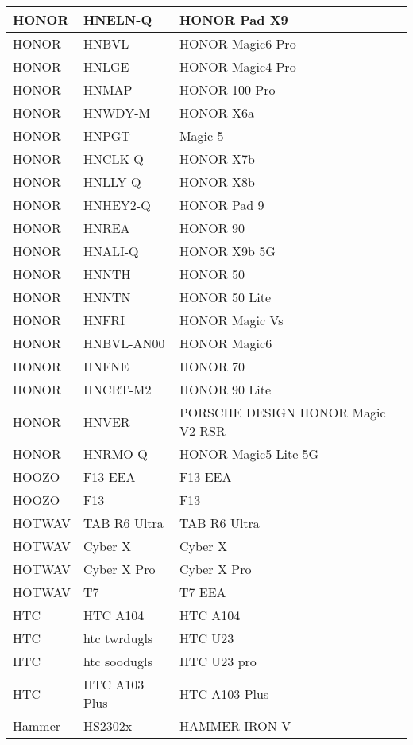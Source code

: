 \begin{tabularx}{\linewidth}{|l|X|X|}
        HONOR & HNELN-Q & HONOR Pad X9 \\ \hline
        HONOR & HNBVL & HONOR Magic6 Pro \\ \hline
        HONOR & HNLGE & HONOR Magic4 Pro \\ \hline
        HONOR & HNMAP & HONOR 100 Pro \\ \hline
        HONOR & HNWDY-M & HONOR X6a \\ \hline
        HONOR & HNPGT & Magic 5 \\ \hline
        HONOR & HNCLK-Q & HONOR X7b \\ \hline
        HONOR & HNLLY-Q & HONOR X8b \\ \hline
        HONOR & HNHEY2-Q & HONOR Pad 9 \\ \hline
        HONOR & HNREA & HONOR 90 \\ \hline
        HONOR & HNALI-Q & HONOR X9b 5G \\ \hline
        HONOR & HNNTH & HONOR 50 \\ \hline
        HONOR & HNNTN & HONOR 50 Lite \\ \hline
        HONOR & HNFRI & HONOR Magic Vs \\ \hline
        HONOR & HNBVL-AN00 & HONOR Magic6 \\ \hline
        HONOR & HNFNE & HONOR 70 \\ \hline
        HONOR & HNCRT-M2 & HONOR 90 Lite \\ \hline
        HONOR & HNVER & PORSCHE DESIGN HONOR Magic V2 RSR \\ \hline
        HONOR & HNRMO-Q & HONOR Magic5 Lite 5G \\ \hline
        HOOZO & F13 EEA & F13 EEA \\ \hline
        HOOZO & F13 & F13 \\ \hline
        HOTWAV & TAB R6 Ultra & TAB R6 Ultra \\ \hline
        HOTWAV & Cyber X & Cyber X \\ \hline
        HOTWAV & Cyber X Pro & Cyber X Pro \\ \hline
        HOTWAV & T7 & T7 EEA \\ \hline
        HTC & HTC A104 & HTC A104 \\ \hline
        HTC & htc twrdugls & HTC U23 \\ \hline
        HTC & htc soodugls & HTC U23 pro \\ \hline
        HTC & HTC A103 Plus & HTC A103 Plus \\ \hline
        Hammer & HS2302x & HAMMER IRON V \\ \hline

\end{tabularx}
